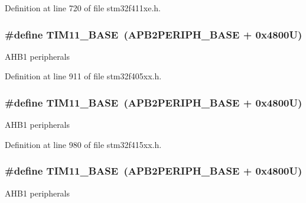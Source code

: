 Definition at line 720 of file stm32f411xe.\+h.

\subsubsection[{\texorpdfstring{T\+I\+M11\+\_\+\+B\+A\+SE}{TIM11_BASE}}]{\setlength{\rightskip}{0pt plus 5cm}\#define T\+I\+M11\+\_\+\+B\+A\+SE~({\bf A\+P\+B2\+P\+E\+R\+I\+P\+H\+\_\+\+B\+A\+SE} + 0x4800\+U)}\hypertarget{group___peripheral__registers__structures_ga3a4a06bb84c703084f0509e105ffaf1d}{}\label{group___peripheral__registers__structures_ga3a4a06bb84c703084f0509e105ffaf1d}
A\+H\+B1 peripherals 

Definition at line 911 of file stm32f405xx.\+h.

\subsubsection[{\texorpdfstring{T\+I\+M11\+\_\+\+B\+A\+SE}{TIM11_BASE}}]{\setlength{\rightskip}{0pt plus 5cm}\#define T\+I\+M11\+\_\+\+B\+A\+SE~({\bf A\+P\+B2\+P\+E\+R\+I\+P\+H\+\_\+\+B\+A\+SE} + 0x4800\+U)}\hypertarget{group___peripheral__registers__structures_ga3a4a06bb84c703084f0509e105ffaf1d}{}\label{group___peripheral__registers__structures_ga3a4a06bb84c703084f0509e105ffaf1d}
A\+H\+B1 peripherals 

Definition at line 980 of file stm32f415xx.\+h.

\subsubsection[{\texorpdfstring{T\+I\+M11\+\_\+\+B\+A\+SE}{TIM11_BASE}}]{\setlength{\rightskip}{0pt plus 5cm}\#define T\+I\+M11\+\_\+\+B\+A\+SE~({\bf A\+P\+B2\+P\+E\+R\+I\+P\+H\+\_\+\+B\+A\+SE} + 0x4800\+U)}\hypertarget{group___peripheral__registers__structures_ga3a4a06bb84c703084f0509e105ffaf1d}{}\label{group___peripheral__registers__structures_ga3a4a06bb84c703084f0509e105ffaf1d}
A\+H\+B1 peripherals 

